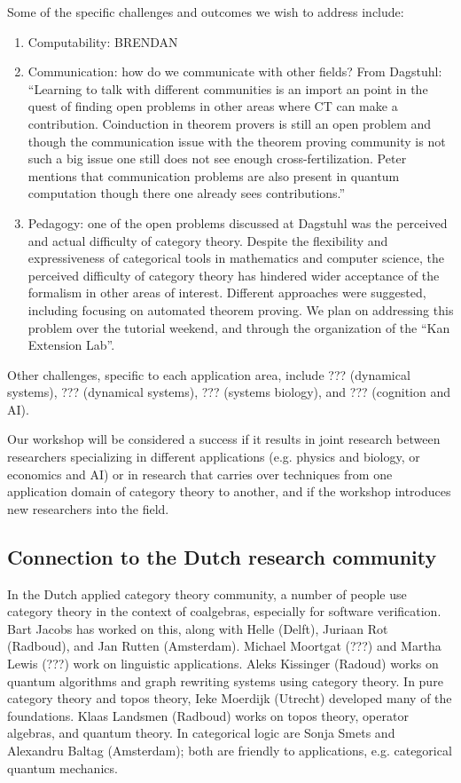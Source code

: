 \documentclass{article}
\newcommand{\redout}[1]{{\color{red}#1}}
\begin{document}
Some of the specific challenges and outcomes we wish to address include:
\begin{enumerate}
\item Computability: \redout{BRENDAN}
\item Communication: \redout{how do we communicate with other fields? From Dagstuhl: ``Learning to talk with different communities is an import an point in the quest of finding open problems in other areas where CT can make a contribution. Coinduction in theorem provers is still an open problem and though the communication issue with the theorem proving community is not such a big issue one still does not see enough cross-fertilization. Peter mentions that communication problems are also present in quantum computation though there one already sees contributions.''}
\item Pedagogy: one of the open problems discussed at Dagstuhl was the perceived and actual difficulty of category theory. Despite the flexibility and expressiveness of categorical tools in mathematics and computer science, the perceived difficulty of category theory has hindered wider acceptance of the formalism in other areas of interest. Different approaches were suggested, including focusing on automated theorem proving. We plan on addressing this problem over the tutorial weekend, and through the organization of the ``Kan Extension Lab''.
\end{enumerate}

Other challenges, specific to each application area, include \redout{???} (dynamical systems), \redout{???} (dynamical systems), \redout{???} (systems biology), and \redout{???} (cognition and AI).

Our workshop will be considered a success if it results in joint research between researchers specializing in different applications (e.g. physics and biology, or economics and AI) or in research that carries over techniques from one application domain of category theory to another, and if the workshop introduces new researchers into the field.

\subsection{Connection to the Dutch research community}
\redout{In the Dutch applied category theory community, a number of people use category theory  in the context of coalgebras, especially for software verification. Bart Jacobs has worked on this, along with Helle (Delft), Juriaan Rot (Radboud), and Jan Rutten (Amsterdam). Michael Moortgat (???) and Martha Lewis (???) work on linguistic applications. Aleks Kissinger (Radoud) works on quantum algorithms and graph rewriting systems using category theory. In pure category theory and topos theory, Ieke Moerdijk (Utrecht) developed many of the foundations. Klaas Landsmen (Radboud) works on topos theory, operator algebras, and quantum theory. In categorical logic are Sonja Smets and Alexandru Baltag (Amsterdam); both are friendly to applications, e.g. categorical quantum mechanics.}
\end{document}
